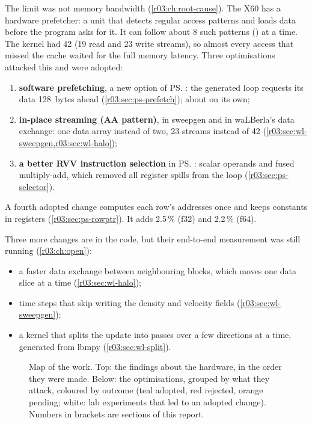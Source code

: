 The limit was not memory bandwidth (\cref{r03:ch:root-cause}). The X60 has a hardware
prefetcher: a unit that detects regular access patterns and loads data before the program
asks for it. It can follow about 8 such patterns () at a time. The kernel
had 42 (19 read and 23 write streams), so almost every access that missed the cache
waited for the full memory latency. Three optimisations attacked this and were adopted:
\begin{enumerate}
  \item \textbf{software prefetching}, a new option of \ps{}: the generated loop requests
        its data 128~bytes ahead (\cref{r03:sec:ps-prefetch}); about  on its own;
  \item \textbf{in-place streaming (AA pattern)}, in sweepgen and in waLBerla's data
        exchange: one data array instead of two, 23 streams instead of 42
        (\cref{r03:sec:wl-sweepgen,r03:sec:wl-halo});
  \item \textbf{a better RVV instruction selection} in \ps{}: scalar operands and fused
        multiply-add, which removed all register spills from the loop
        (\cref{r03:sec:ps-selector}).
\end{enumerate}
A fourth adopted change computes each row's addresses once and keeps constants in
registers (\cref{r03:sec:ps-rowptr}). It adds 2.5\,\% (f32) and 2.2\,\% (f64).

Three more changes are in the code, but their end-to-end measurement was still running
(\cref{r03:ch:open}):
\begin{itemize}
  \item a faster data exchange between neighbouring blocks, which moves one data slice at a
        time (\cref{r03:sec:wl-halo});
  \item time steps that skip writing the density and velocity fields
        (\cref{r03:sec:wl-sweepgen});
  \item a kernel that splits the update into passes over a few directions at a time,
        generated from lbmpy (\cref{r03:sec:wl-split}).
\end{itemize}

\begin{figure}[htbp]
  \centering
  \resizebox{\linewidth}{!}{}
  \caption[Map of the findings and optimisations]{Map of the work. Top: the findings about
    the hardware, in the order they were made. Below: the optimisations, grouped by what they
    attack, coloured by outcome (teal adopted, red rejected, orange pending; white: lab
    experiments that led to an adopted change). Numbers in brackets are sections of this
    report.}\label{r03:fig:story}
\end{figure}


